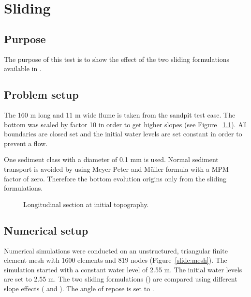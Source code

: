 \chapter{Sliding}
%

%
\section{Purpose}
%
The purpose of this test is to show the effect of the two sliding formulations
available in \gaia{}.

%
\section{Problem setup}
%
The 160 m long and 11 m wide flume is taken from the sandpit test case.
The bottom was scaled by factor 10 in order to get higher slopes (see Figure
~\ref{slide:bottom}). All boundaries are closed set and the initial 
water levels are set constant in order to prevent a flow.

One sediment class with a diameter of 0.1 mm is used. Normal sediment transport
is avoided by using Meyer-Peter and Müller formula with a MPM factor of zero.
Therefore the bottom evolution origins only from the sliding formulations.


\begin{figure}[!h]
\centering
{}
 \caption{Longitudinal section at initial topography.}\label{slide:bottom}
\end{figure}

\section{Numerical setup}
%
Numerical simulations were conducted on an unstructured, triangular finite
element mesh with $1600$ elements and $819$ nodes (Figure~\ref{slide:mesh}).
The simulation started with a constant water level of 2.55 m.
The initial water levels are set to 2.55 m.
The two sliding formulations  () are compared
using different slope effects
 ( and ).
The angle of repose is set to .

